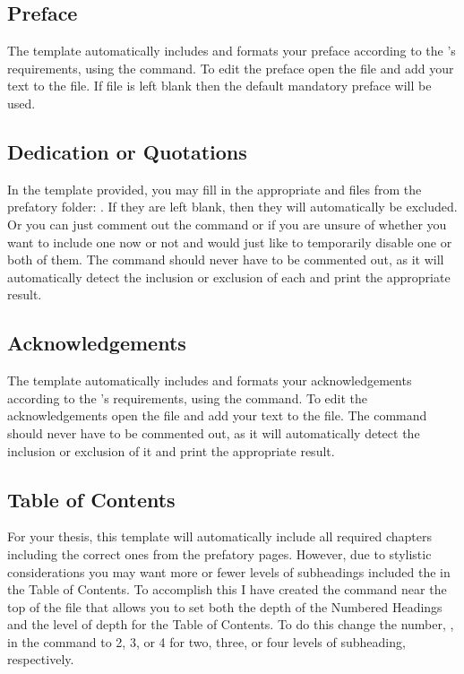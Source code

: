 		\subsection{Preface}\label{preface}
			The template automatically includes and formats your preface according to the \Faculty's requirements, using the  command.
			To edit the preface open the file  and add your text to the file.
			If file is left blank then the default mandatory preface will be used.

		\subsection{Dedication or Quotations}\label{quote}\label{dedication}

			In the template provided, you may fill in the appropriate  and  files from the prefatory folder: .
			If they are left blank, then they will automatically be excluded.
			Or you can just comment out the command  or  if you are unsure of whether you want to include one now or not and would just like to temporarily disable one or both of them.
			The command  should never have to be commented out, as it will automatically detect the inclusion or exclusion of each and print the appropriate result.

		\subsection{Acknowledgements}\label{acknowledgement}
			The template automatically includes and formats your acknowledgements according to the \Faculty's requirements, using the  command.
			To edit the acknowledgements open the file  and add your text to the file.
			The command  should never have to be commented out, as it will automatically detect the inclusion or exclusion of it and print the appropriate result.

		\subsection{Table of Contents}\label{toc}
			For your thesis, this template will automatically include all required chapters including the correct ones from the prefatory pages.
			However, due to stylistic considerations you may want more or fewer levels of subheadings included the in the Table of Contents.
			To accomplish this I have created the command near the top of the  file that allows you to set both the depth of the Numbered Headings and the level of depth for the Table of Contents.
			To do this change the number, , in the  command to 2, 3, or 4 for two, three, or four levels of subheading, respectively.

